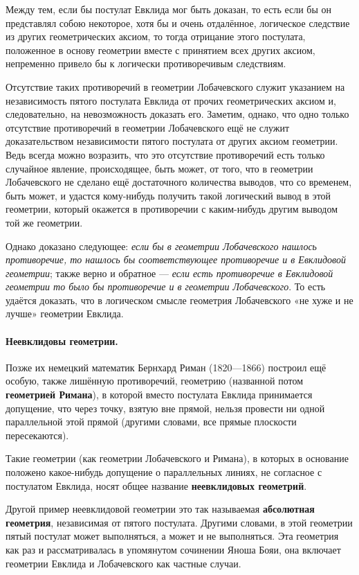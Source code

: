 \documentclass[twoside]{book}
\makeatletter
\newcommand{\rindex}[2][\imki@jobname]{%
  \index[#1]{\detokenize{#2}}%
}
\makeatother
\begin{document}
Между тем, если бы постулат Евклида мог быть доказан, то есть если бы он представлял собою
некоторое, хотя бы и очень отдалённое, логическое следствие из других геометрических аксиом, то тогда отрицание этого постулата, положенное в основу геометрии вместе с принятием всех других аксиом, непременно привело бы к логически противоречивым следствиям.

Отсутствие таких противоречий в геометрии Лобачевского служит указанием на независимость пятого
постулата Евклида от прочих геометрических аксиом и, следовательно, на невозможность доказать его.
Заметим, однако, что одно только отсутствие противоречий в геометрии Лобачевского ещё не служит доказательством независимости пятого постулата от других аксиом геометрии.
Ведь всегда можно возразить, что это отсутствие противоречий есть только
случайное явление, происходящее, быть может, от того, что в геометрии Лобачевского не сделано ещё достаточного количества выводов, что со временем, быть может, и удастся кому-нибудь получить
такой логический вывод в этой геометрии, который окажется в противоречии с каким-нибудь другим выводом той же геометрии.

Однако доказано следующее: \emph{если бы в геометрии Лобачевского нашлось противоречие, то нашлось бы соответствующее противоречие и в Евклидовой геометрии};
также верно и обратное --- \emph{если есть противоречие в Евклидовой геометрии то  было бы  противоречие и в геометрии Лобачевского}.
То есть удаётся доказать, что в логическом смысле геометрия Лобачевского «не хуже и не лучше» геометрии Евклида.


\paragraph{Неевклидовы геометрии.}\label{1914/94} 
Позже их немецкий математик Бернхард Риман (1820—1866) построил ещё особую, также лишённую противоречий, геометрию (названной потом \textbf{геометрией Римана}),
в которой вместо постулата Евклида принимается допущение, что
через точку, взятую вне прямой, нельзя провести ни одной параллельной этой прямой (другими словами, все прямые плоскости пересекаются).

Такие геометрии (как геометрии Лобачевского и Римана), в которых в основание положено какое-нибудь допущение о параллельных линиях, не согласное с постулатом Евклида, носят общее название
\textbf{неевклидовых геометрий}.

Другой пример неевклидовой геометрии это так называемая \rindex{абсолютная геометри}\textbf{абсолютная геометрия}, независимая от пятого постулата.
Другими словами, в этой геометрии пятый постулат может выполняться, а может и не выполняться.
Эта геометрия как раз и рассматривалась в упомянутом сочинении Яноша Бояи,
она включает геометрии Евклида и Лобачевского как частные случаи.
\end{document}
